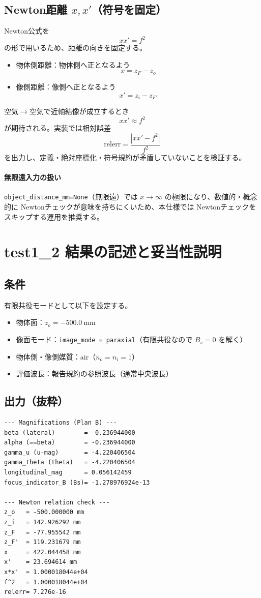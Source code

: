 \subsection{Newton距離 $x, x'$（符号を固定）}
Newton公式を
\[
x x' = f^2
\]
の形で用いるため、距離の向きを固定する。
\begin{itemize}
  \item 物体側距離：物体側へ正となるよう
  \[
  \boxed{x = z_F - z_o}
  \]
  \item 像側距離：像側へ正となるよう
  \[
  \boxed{x' = z_i - z_{F'}}
  \]
\end{itemize}
空気$\to$空気で近軸結像が成立するとき
\[
\boxed{x x' \approx f^2}
\]
が期待される。実装では相対誤差
\[
\mathrm{relerr} = \frac{|x x' - f^2|}{f^2}
\]
を出力し、定義・絶対座標化・符号規約が矛盾していないことを検証する。

\paragraph{無限遠入力の扱い}
\texttt{object\_distance\_mm=None}（無限遠）では $x\to\infty$ の極限になり、数値的・概念的に Newtonチェックが意味を持ちにくいため、本仕様では Newtonチェックをスキップする運用を推奨する。

\section{test1\_2 結果の記述と妥当性説明}

\subsection{条件}
有限共役モードとして以下を設定する。
\begin{itemize}
  \item 物体面：$z_o=-500.0\ \mathrm{mm}$
  \item 像面モード：\texttt{image\_mode = paraxial}（有限共役なので $B_s=0$ を解く）
  \item 物体側・像側媒質：air（$n_o=n_i=1$）
  \item 評価波長：報告規約の参照波長（通常中央波長）
\end{itemize}

\subsection{出力（抜粋）}
\begin{verbatim}
--- Magnifications (Plan B) --- 
beta (lateral)        = -0.236944000
alpha (==beta)        = -0.236944000
gamma_u (u-mag)       = -4.220406504
gamma_theta (theta)   = -4.220406504
longitudinal_mag      = 0.056142459
focus_indicator_B (Bs)= -1.278976924e-13

--- Newton relation check ---     
z_o   = -500.000000 mm
z_i   = 142.926292 mm
z_F   = -77.955542 mm
z_F'  = 119.231679 mm
x     = 422.044458 mm
x'    = 23.694614 mm
x*x'  = 1.000018044e+04
f^2   = 1.000018044e+04
relerr= 7.276e-16
\end{verbatim}

